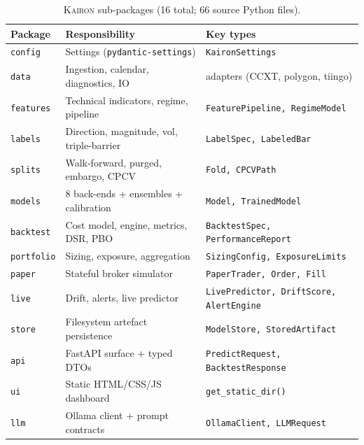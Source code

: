 \documentclass[11pt,a4paper]{article}
\providecommand{\kairon}{\textsc{Kairon}}
\begin{document}
\begin{table}[htbp]
\centering
\small
\caption{\kairon{} sub-packages (16 total; 66 source Python files).}
\label{tab:packages}
\begin{tabularx}{\linewidth}{@{}lXl@{}}
\toprule
\textbf{Package} & \textbf{Responsibility} & \textbf{Key types}\\
\midrule
\texttt{config}    & Settings (\texttt{pydantic-settings})       & \texttt{KaironSettings}\\
\texttt{data}      & Ingestion, calendar, diagnostics, IO       & adapters (CCXT, polygon, tiingo)\\
\texttt{features}  & Technical indicators, regime, pipeline     & \texttt{FeaturePipeline, RegimeModel}\\
\texttt{labels}    & Direction, magnitude, vol, triple-barrier  & \texttt{LabelSpec, LabeledBar}\\
\texttt{splits}    & Walk-forward, purged, embargo, CPCV        & \texttt{Fold, CPCVPath}\\
\texttt{models}    & 8 back-ends + ensembles + calibration      & \texttt{Model, TrainedModel}\\
\texttt{backtest}  & Cost model, engine, metrics, DSR, PBO      & \texttt{BacktestSpec, PerformanceReport}\\
\texttt{portfolio} & Sizing, exposure, aggregation              & \texttt{SizingConfig, ExposureLimits}\\
\texttt{paper}     & Stateful broker simulator                  & \texttt{PaperTrader, Order, Fill}\\
\texttt{live}      & Drift, alerts, live predictor              & \texttt{LivePredictor, DriftScore, AlertEngine}\\
\texttt{store}     & Filesystem artefact persistence            & \texttt{ModelStore, StoredArtifact}\\
\texttt{api}       & FastAPI surface + typed DTOs               & \texttt{PredictRequest, BacktestResponse}\\
\texttt{ui}        & Static HTML/CSS/JS dashboard               & \texttt{get\_static\_dir()}\\
\texttt{llm}       & Ollama client + prompt contracts           & \texttt{OllamaClient, LLMRequest}\\
\bottomrule
\end{tabularx}
\end{table}
\end{document}
